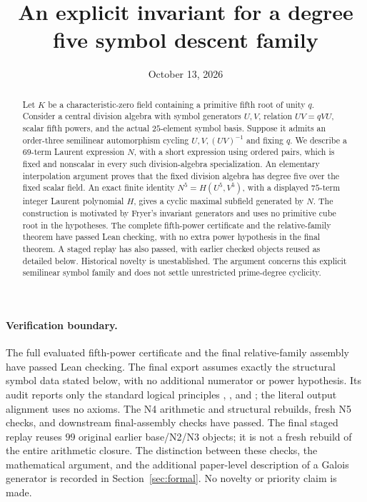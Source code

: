 \documentclass[11pt,letterpaper]{article}
\title{An explicit invariant for a degree five symbol descent family}
\author{}
\date{October 13, 2026}
\theoremstyle{definition}
\theoremstyle{remark}
\newcommand{\code}[1]{\texttt{\detokenize{#1}}}
\begin{document}
\maketitle
\begin{abstract}
Let $K$ be a characteristic-zero field containing a primitive fifth root of
unity $q$. Consider a central division algebra with symbol generators
$U,V$, relation $UV=qVU$, scalar fifth powers, and the actual $25$-element
symbol basis. Suppose it admits an order-three semilinear automorphism
cycling $U,V,(UV)^{-1}$ and fixing $q$. We describe a $69$-term Laurent
expression $N$, with a short expression using ordered pairs, which is
fixed and nonscalar in every such division-algebra specialization. An
elementary interpolation argument proves that the fixed division algebra
has degree five over the fixed scalar field. An exact finite identity
$N^5=H(U^5,V^5)$, with a displayed $75$-term integer Laurent polynomial $H$,
gives a cyclic maximal subfield generated by $N$. The construction
is motivated by Fryer's invariant generators and uses no primitive cube
root in the hypotheses. The complete fifth-power certificate and the
relative-family theorem have passed Lean checking, with no extra power
hypothesis in the final theorem. A staged replay has also passed, with
earlier checked objects reused as detailed below. Historical novelty is
unestablished. The argument concerns this explicit
semilinear symbol family and does not settle unrestricted prime-degree
cyclicity.
\end{abstract}

\paragraph{Verification boundary.}
The full evaluated fifth-power certificate and the final relative-family
assembly have passed Lean checking. The final export assumes exactly the
structural symbol data stated below, with no additional numerator or
power hypothesis. Its audit reports only the standard logical principles
\code{propext}, \code{Classical.choice}, and \code{Quot.sound}; the literal
output alignment uses no axioms. The N4 arithmetic and structural
rebuilds, fresh N5 checks, and downstream final-assembly checks have
passed. The final staged replay reuses $99$ original earlier base/N2/N3
objects; it is not a fresh rebuild of the entire arithmetic closure.
The distinction between these checks, the mathematical argument, and the
additional paper-level description of a Galois generator is recorded in
Section~\ref{sec:formal}. No novelty or priority claim is made.
\end{document}
